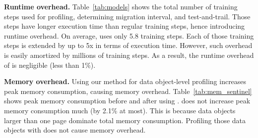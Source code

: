 \begin{spacing}{0.95}
\textcolor{check}{\textbf{Runtime overhead.}%
Table~\ref{tab:models} shows the total number of training steps used for profiling, determining migration interval,  and test-and-trail. Those steps have longer execution time than regular training steps, hence introducing runtime overhead. On average, \name uses only 5.8 training steps. Each of those training steps is extended by up to \textcolor{check}{5x} in terms of execution time. However, such overhead is easily amortized by millions of training steps. As a result, the runtime overhead of \name is negligible (less than 1\%).}


\textcolor{check}{\textbf{Memory overhead.}
Using our method for data object-level profiling increases peak memory consumption, causing memory overhead. Table~\ref{tab:mem_sentinel} shows peak memory consumption before and after using \name. \name does not increase peak memory consumption much (by 2.1\% at most). This is because data objects larger than one page dominate total memory consumption. Profiling those data objects with \name does not cause memory overhead.}
\end{spacing}


